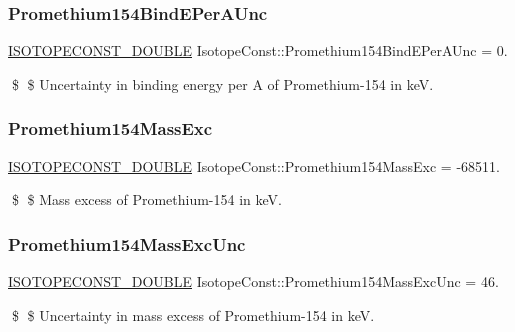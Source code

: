 \subsubsection{\texorpdfstring{Promethium154\+Bind\+E\+Per\+A\+Unc}{Promethium154BindEPerAUnc}}
{\footnotesize\ttfamily \mbox{\hyperlink{group___isotope_const-_macros_ga8f45a7272ce02c0b4c65c44636ed719a}{I\+S\+O\+T\+O\+P\+E\+C\+O\+N\+S\+T\+\_\+\+D\+O\+U\+B\+LE}} Isotope\+Const\+::\+Promethium154\+Bind\+E\+Per\+A\+Unc = 0.}

\$ \$ Uncertainty in binding energy per A of Promethium-\/154 in keV. \mbox{\label{group___isotope_const-_promethium-_pm154_ga8e47801f09d54bdad25498090df831f4}} 
\subsubsection{\texorpdfstring{Promethium154\+Mass\+Exc}{Promethium154MassExc}}
{\footnotesize\ttfamily \mbox{\hyperlink{group___isotope_const-_macros_ga8f45a7272ce02c0b4c65c44636ed719a}{I\+S\+O\+T\+O\+P\+E\+C\+O\+N\+S\+T\+\_\+\+D\+O\+U\+B\+LE}} Isotope\+Const\+::\+Promethium154\+Mass\+Exc = -\/68511.}

\$ \$ Mass excess of Promethium-\/154 in keV. \mbox{\label{group___isotope_const-_promethium-_pm154_gad4d6746c6474e6bcc8f341aa136cf1d0}} 
\subsubsection{\texorpdfstring{Promethium154\+Mass\+Exc\+Unc}{Promethium154MassExcUnc}}
{\footnotesize\ttfamily \mbox{\hyperlink{group___isotope_const-_macros_ga8f45a7272ce02c0b4c65c44636ed719a}{I\+S\+O\+T\+O\+P\+E\+C\+O\+N\+S\+T\+\_\+\+D\+O\+U\+B\+LE}} Isotope\+Const\+::\+Promethium154\+Mass\+Exc\+Unc = 46.}

\$ \$ Uncertainty in mass excess of Promethium-\/154 in keV. \mbox{\label{group___isotope_const-_promethium-_pm154_ga9f4cd5c2603391fd64b037860b2144af}} 

